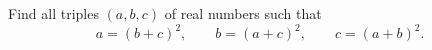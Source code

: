 Find all triples $(a,b,c)$ of real numbers such that
\[
a=(b+c)^2,\qquad b=(a+c)^2,\qquad c=(a+b)^2 .
\]
